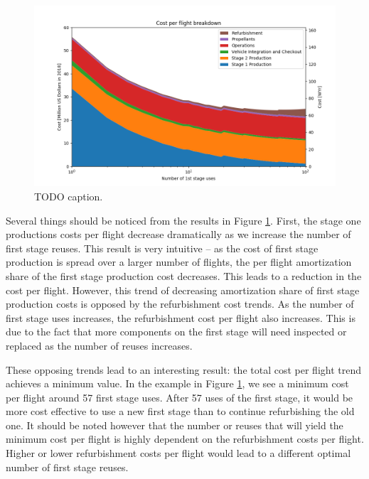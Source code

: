 \documentclass[conf]{new-aiaa}
\begin{document}
\begin{figure}[hbt!]
    \centering
    \includegraphics[width=\textwidth]{../../lvreuse/analysis/combined/plots/cpf_stackplot_reuses_sweep}
    \caption{\label{fig:cpf_stackplot_reuses_sweep} TODO caption.}
\end{figure}

Several things should be noticed from the results in Figure \ref{fig:cpf_stackplot_reuses_sweep}. First, the stage one productions costs per flight decrease dramatically as we increase the number of first stage reuses. This result is very intuitive -- as the cost of first stage production is spread over a larger number of flights, the per flight amortization share of the first stage production cost decreases. This leads to a reduction in the cost per flight. However, this trend of decreasing amortization share of first stage production costs is opposed by the refurbishment cost trends. As the number of first stage uses increases, the refurbishment cost per flight also increases. This is due to the fact that more components on the first stage will need inspected or replaced  as the number of reuses increases. 

These opposing trends lead to an interesting result: the total cost per flight trend achieves a minimum value. In the example in Figure \ref{fig:cpf_stackplot_reuses_sweep}, we see a minimum cost per flight around 57 first stage uses. After 57 uses of the first stage, it would be more cost effective to use a new first stage than to continue refurbishing the old one. It should be noted however that the number or reuses that will yield the minimum cost per flight is highly dependent on the refurbishment costs per flight. Higher or lower refurbishment costs per flight would lead to a different optimal number of first stage reuses.
\end{document}
